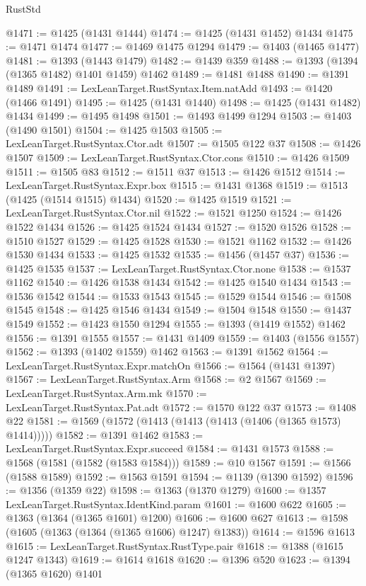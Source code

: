 \begin{lexlean}{RustStd}
\begin{coremodule}
@1471 := @1425 (@1431 @1444)
@1474 := @1425 (@1431 @1452) @1434
@1475 := @1471 @1474
@1477 := @1469 @1475 @1294
@1479 := @1403 (@1465 @1477)
@1481 := @1393 (@1443 @1479)
@1482 := @1439 @359
@1488 := @1393 (@1394 (@1365 @1482) @1401 @1459) @1462
@1489 := @1481 @1488
@1490 := @1391 @1489
@1491 := LexLeanTarget.RustSyntax.Item.natAdd
@1493 := @1420 (@1466 @1491)
@1495 := @1425 (@1431 @1440)
@1498 := @1425 (@1431 @1482) @1434
@1499 := @1495 @1498
@1501 := @1493 @1499 @1294
@1503 := @1403 (@1490 @1501)
@1504 := @1425 @1503
@1505 := LexLeanTarget.RustSyntax.Ctor.adt
@1507 := @1505 @122 @37
@1508 := @1426 @1507
@1509 := LexLeanTarget.RustSyntax.Ctor.cons
@1510 := @1426 @1509
@1511 := @1505 @83
@1512 := @1511 @37
@1513 := @1426 @1512
@1514 := LexLeanTarget.RustSyntax.Expr.box
@1515 := @1431 @1368
@1519 := @1513 (@1425 (@1514 @1515) @1434)
@1520 := @1425 @1519
@1521 := LexLeanTarget.RustSyntax.Ctor.nil
@1522 := @1521 @1250
@1524 := @1426 @1522 @1434
@1526 := @1425 @1524 @1434
@1527 := @1520 @1526
@1528 := @1510 @1527
@1529 := @1425 @1528
@1530 := @1521 @1162
@1532 := @1426 @1530 @1434
@1533 := @1425 @1532
@1535 := @1456 (@1457 @37)
@1536 := @1425 @1535
@1537 := LexLeanTarget.RustSyntax.Ctor.none
@1538 := @1537 @1162
@1540 := @1426 @1538 @1434
@1542 := @1425 @1540 @1434
@1543 := @1536 @1542
@1544 := @1533 @1543
@1545 := @1529 @1544
@1546 := @1508 @1545
@1548 := @1425 @1546 @1434
@1549 := @1504 @1548
@1550 := @1437 @1549
@1552 := @1423 @1550 @1294
@1555 := @1393 (@1419 @1552) @1462
@1556 := @1391 @1555
@1557 := @1431 @1409
@1559 := @1403 (@1556 @1557)
@1562 := @1393 (@1402 @1559) @1462
@1563 := @1391 @1562
@1564 := LexLeanTarget.RustSyntax.Expr.matchOn
@1566 := @1564 (@1431 @1397)
@1567 := LexLeanTarget.RustSyntax.Arm
@1568 := @2 @1567
@1569 := LexLeanTarget.RustSyntax.Arm.mk
@1570 := LexLeanTarget.RustSyntax.Pat.adt
@1572 := @1570 @122 @37
@1573 := @1408 @22
@1581 := @1569 (@1572 (@1413 (@1413 (@1413 (@1406 (@1365 @1573) @1414)))))
@1582 := @1391 @1462
@1583 := LexLeanTarget.RustSyntax.Expr.succeed
@1584 := @1431 @1573
@1588 := @1568 (@1581 (@1582 (@1583 @1584)))
@1589 := @10 @1567
@1591 := @1566 (@1588 @1589)
@1592 := @1563 @1591
@1594 := @1139 (@1390 @1592)
@1596 := @1356 (@1359 @22)
@1598 := @1363 (@1370 @1279)
@1600 := @1357 LexLeanTarget.RustSyntax.IdentKind.param
@1601 := @1600 @622
@1605 := @1363 (@1364 (@1365 @1601) @1200)
@1606 := @1600 @627
@1613 := @1598 (@1605 (@1363 (@1364 (@1365 @1606) @1247) @1383))
@1614 := @1596 @1613
@1615 := LexLeanTarget.RustSyntax.RustType.pair
@1618 := @1388 (@1615 @1247 @1343)
@1619 := @1614 @1618
@1620 := @1396 @520
@1623 := @1394 (@1365 @1620) @1401

\end{coremodule}
\end{lexlean}

